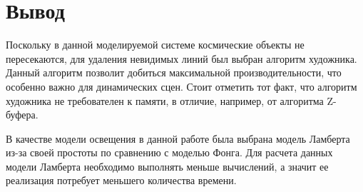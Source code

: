 \section{Вывод}

Поскольку в данной моделируемой системе космические объекты не пересекаются, для  удаления невидимых линий был выбран алгоритм художника. Данный алгоритм позволит добиться максимальной производительности, что особенно важно для динамических сцен. Стоит отметить тот факт, что алгоритм художника не требователен к памяти, в отличие, например, от алгоритма Z-буфера.

В качестве модели освещения в данной работе была выбрана модель Ламберта из-за своей простоты по сравнению с моделью Фонга. Для расчета данных модели Ламберта необходимо выполнять меньше вычислений, а значит ее реализация потребует меньшего количества времени.


